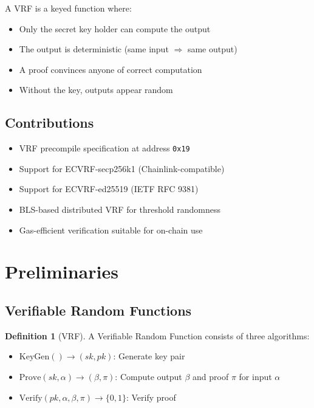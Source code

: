\documentclass[11pt,a4paper]{article}
\theoremstyle{definition}
\newtheorem{definition}{Definition}
\begin{document}
A VRF is a keyed function where:
\begin{itemize}
    \item Only the secret key holder can compute the output
    \item The output is deterministic (same input $\Rightarrow$ same output)
    \item A proof convinces anyone of correct computation
    \item Without the key, outputs appear random
\end{itemize}

\subsection{Contributions}

\begin{itemize}
    \item VRF precompile specification at address \texttt{0x19}
    \item Support for ECVRF-secp256k1 (Chainlink-compatible)
    \item Support for ECVRF-ed25519 (IETF RFC 9381)
    \item BLS-based distributed VRF for threshold randomness
    \item Gas-efficient verification suitable for on-chain use
\end{itemize}

\section{Preliminaries}

\subsection{Verifiable Random Functions}

\begin{definition}[VRF]
A Verifiable Random Function consists of three algorithms:
\begin{itemize}
    \item $\text{KeyGen}() \to (sk, pk)$: Generate key pair
    \item $\text{Prove}(sk, \alpha) \to (\beta, \pi)$: Compute output $\beta$ and proof $\pi$ for input $\alpha$
    \item $\text{Verify}(pk, \alpha, \beta, \pi) \to \{0, 1\}$: Verify proof
\end{itemize}
\end{definition}
\end{document}
